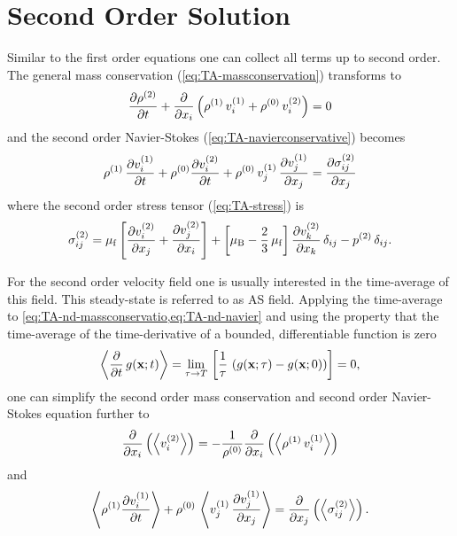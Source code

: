 \section{Second Order Solution\label{sec:TA-secondorder}}

Similar to the first order equations one can collect all terms up to second 
order. The general mass conservation (\cref{eq:TA-massconservation}) transforms 
to
\begin{equation}
  \pdv{  \rho^{(2)}  }{t} + \pdv{x_{i}}\left(\rho^{(1)}\,v_{i}^{(1)} 
  + \rho^{(0)}\,v_{i}^{(2)} \right) = 0
  \label{eq:TA-nd-massconservatio}
\end{equation}
and the second order Navier-Stokes (\cref{eq:TA-navierconservative}) becomes
\begin{equation}
  \rho^{(1)}\,\pdv{  v_{i}^{(1)}  }{t} + \rho^{(0)} 
  \pdv{  v_{i}^{(2)}  }{t} + 
  \rho^{(0)}\,v_{j}^{(1)}\,\pdv{  v_{j}^{(1)}  }{x_{j}} = 
  \pdv{  \sigma_{ij}^{(2)}  }{x_{j}}
  \label{eq:TA-nd-navier}
\end{equation}
where the second order stress tensor (\cref{eq:TA-stress}) is
\begin{equation}
  \sigma_{ij}^{(2)} = \mu_{\mathrm{f}}\left[ \pdv{  v_{i}^{(2)}  }{x_{j}} + 
  \pdv{  v_{j}^{(2)}  }{x_{i}} \right] + \left[ \mu_{\mathrm{B}} - 
  \frac{2}{3}\,\mu_{\mathrm{f}} \right] \pdv{  v_{k}^{(2)}  }{x_{k}} \,\delta_{ij} - 
  p^{(2)}\,\delta_{ij}.
  \label{eq:TA-nd-stress}
\end{equation}

For the second order velocity field one is usually interested in the 
time-average of this field. This steady-state is referred to as AS field. 
Applying the time-average to \cref{eq:TA-nd-massconservatio,eq:TA-nd-navier} 
and using the property that the time-average of the time-derivative of a 
bounded, differentiable function is zero~\cite{Baasch2020}
\begin{equation}
  \left\langle \pdv{t}\,g(\vb{x};t) \right\rangle = \lim\limits_{\tau \rightarrow T}{\,
    \left[ \frac{1}{\tau}\,\left( g(\vb{x}; \tau) - g(\vb{x}; 0) \right) 
  \right]} = 0,
  \label{eq:TA-avg-property}
\end{equation}
one can simplify the second order mass conservation and second order 
Navier-Stokes equation further to
\begin{equation}
  \pdv{x_{i}}\left( \left\langle v_{i}^{(2)} \right\rangle \right) = 
  -\frac{1}{\rho^{(0)}} \pdv{x_{i}}\left(\left\langle  
  \rho^{(1)}\,v_{i}^{(1)}  \right\rangle\right)
  \label{eq:TA-avg-massconservatio}
\end{equation}
and
\begin{equation}
  \left\langle \rho^{(1)} \pdv{  v_{i}^{(1)}  }{t} \right\rangle + 
  \rho^{(0)}\,\left\langle v_{j}^{(1)}\,\pdv{  v_{j}^{(1)}  }{x_{j}} \right\rangle 
  = \pdv{x_{j}}\left( \left\langle \sigma_{ij}^{(2)} \right\rangle \right).
  \label{eq:TA-avg-navier}
\end{equation}


